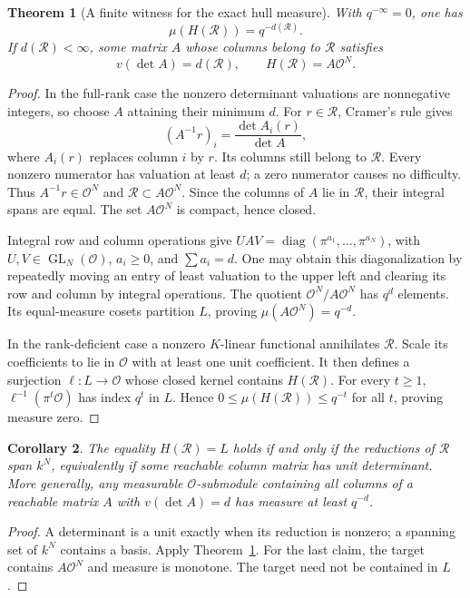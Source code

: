 \documentclass[11pt]{amsart}
\newtheorem{theorem}{Theorem}[section]
\newtheorem{corollary}[theorem]{Corollary}
\theoremstyle{definition}
\theoremstyle{remark}
\newcommand{\OO}{\mathcal O}
\newcommand{\GL}{\operatorname{GL}}
\begin{document}
\begin{theorem}[A finite witness for the exact hull measure]\label{thm:lattice}
With $q^{-\infty}=0$, one has
\[
 \mu(H(\mathcal R))=q^{-d(\mathcal R)}.
\]
If $d(\mathcal R)<\infty$, some matrix $A$ whose columns belong to
$\mathcal R$ satisfies
\[
 v(\det A)=d(\mathcal R),\qquad H(\mathcal R)=A\OO^N.
\]
\end{theorem}
\begin{proof}
In the full-rank case the nonzero determinant valuations are nonnegative
integers, so choose $A$ attaining their minimum $d$.
For $r\in\mathcal R$, Cramer's rule gives
\[
 (A^{-1}r)_i=\frac{\det A_i(r)}{\det A},
\]
where $A_i(r)$ replaces column $i$ by $r$.
Its columns still belong to $\mathcal R$. Every nonzero numerator has
valuation at least $d$; a zero numerator causes no difficulty.
Thus $A^{-1}r\in\OO^N$ and $\mathcal R\subset A\OO^N$.
Since the columns of $A$ lie in $\mathcal R$, their integral spans are equal.
The set $A\OO^N$ is compact, hence closed.

Integral row and column operations give
$UAV=\operatorname{diag}(\pi^{a_1},\ldots,\pi^{a_N})$, with
$U,V\in\GL_N(\OO)$, $a_i\ge0$, and $\sum a_i=d$.
One may obtain this diagonalization by repeatedly moving an entry of least
valuation to the upper left and clearing its row and column by integral
operations. The quotient $\OO^N/A\OO^N$ has $q^d$ elements.
Its equal-measure cosets partition $L$, proving $\mu(A\OO^N)=q^{-d}$.

In the rank-deficient case a nonzero $K$-linear functional annihilates
$\mathcal R$. Scale its coefficients to lie in $\OO$ with at least one
unit coefficient. It then defines a surjection $\ell:L\to\OO$ whose
closed kernel contains $H(\mathcal R)$. For every $t\ge1$,
$\ell^{-1}(\pi^t\OO)$ has index $q^t$ in $L$. Hence
$0\le\mu(H(\mathcal R))\le q^{-t}$ for all $t$, proving measure zero.
\end{proof}

\begin{corollary}\label{cor:residue}
The equality $H(\mathcal R)=L$ holds if and only if the reductions of
$\mathcal R$ span $k^N$, equivalently if some reachable column matrix has
unit determinant. More generally, any measurable $\OO$-submodule containing
all columns of a reachable matrix $A$ with $v(\det A)=d$ has measure at least
$q^{-d}$.
\end{corollary}
\begin{proof}
A determinant is a unit exactly when its reduction is nonzero; a spanning
set of $k^N$ contains a basis. Apply Theorem~\ref{thm:lattice}.
For the last claim, the target contains $A\OO^N$ and measure is monotone.
The target need not be contained in $L$.
\end{proof}
\end{document}
